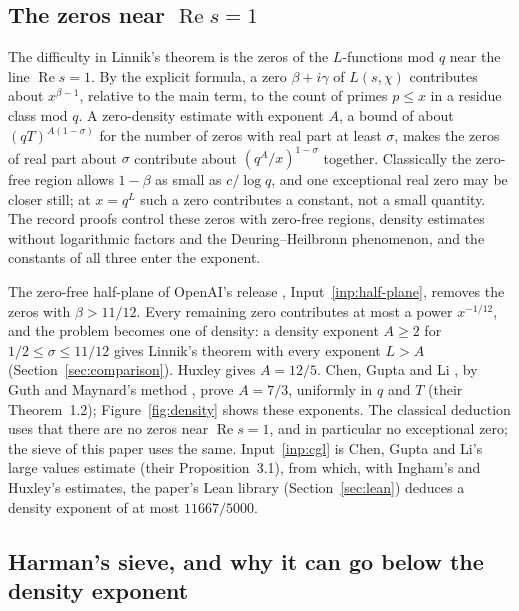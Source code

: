 \documentclass[11pt]{article}
\theoremstyle{definition}
\begin{document}
\subsection*{The zeros near $\operatorname{Re} s = 1$}

The difficulty in Linnik's theorem is the zeros of the $L$-functions mod $q$ near the line $\operatorname{Re} s = 1$.
By the explicit formula, a zero $\beta + i\gamma$ of $L(s, \chi)$ contributes about $x^{\beta - 1}$, relative to the
main term, to the count of primes $p \le x$ in a residue class mod $q$. A zero-density estimate with exponent $A$, a
bound of about $(qT)^{A(1 - \sigma)}$ for the number of zeros with real part at least $\sigma$, makes the zeros of
real part about $\sigma$ contribute about $(q^A/x)^{1 - \sigma}$ together. Classically the zero-free region allows
$1 - \beta$ as small as $c/\log q$, and one exceptional real zero may be closer still; at $x = q^L$ such a zero
contributes a constant, not a small quantity. The record proofs control these zeros with zero-free regions, density
estimates without logarithmic factors and the Deuring--Heilbronn phenomenon, and the constants of all three enter the
exponent.

The zero-free half-plane of OpenAI's release \cite{openai-main, openai-companion}, Input~\ref{inp:half-plane}, removes
the zeros with $\beta > 11/12$. Every remaining zero contributes at most a power $x^{-1/12}$, and the problem becomes
one of density: a density exponent $A \ge 2$ for $1/2 \le \sigma \le 11/12$ gives Linnik's theorem with every exponent
$L > A$ (Section~\ref{sec:comparison}). Huxley \cite{huxley75} gives $A = 12/5$. Chen, Gupta and Li \cite{cgl}, by Guth
and Maynard's method \cite{guth-maynard}, prove $A = 7/3$, uniformly in $q$ and $T$ (their Theorem~1.2);
Figure~\ref{fig:density} shows these exponents. The classical deduction uses that there are no zeros near
$\operatorname{Re} s = 1$, and in particular no exceptional zero; the sieve of this paper uses the same.
Input~\ref{inp:cgl} is Chen, Gupta and Li's large values estimate (their Proposition~3.1), from which, with Ingham's
and Huxley's estimates, the paper's Lean library (Section~\ref{sec:lean}) deduces a density exponent of at most
$11667/5000$.

\subsection*{Harman's sieve, and why it can go below the density exponent}
\end{document}

